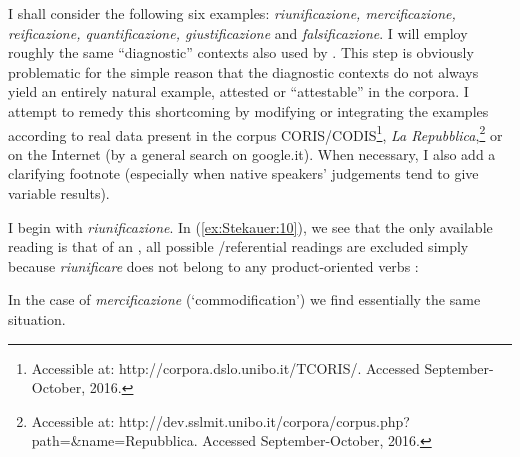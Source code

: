 \documentclass[output=paper]{langsci/langscibook}
\begin{document}
I shall consider the following six examples: \emph{riunificazione,
mercificazione, reificazione, quantificazione, giustificazione} and
\emph{falsificazione}. I will employ roughly the same ``diagnostic''
contexts also used by %
\citealt{Melloni2011}%
%
. This step is obviously problematic
for the simple reason that the diagnostic contexts do not always yield
an entirely natural example, attested or ``attestable'' in the corpora.
I attempt to remedy this shortcoming by modifying or integrating the
examples according to real data present in the corpus
CORIS/CODIS\footnote{Accessible at:
  http://corpora.dslo.unibo.it/TCORIS/. Accessed  September-October,
  2016.}, \emph{La Repubblica},\footnote{Accessible at:
  http://dev.sslmit.unibo.it/corpora/corpus.php?path=\&name=Repubblica.
  Accessed  Sep\-tember-October, 2016.} or on the Internet (by a general
search on google.it). When necessary, I also add a clarifying footnote
(especially when native speakers' judgements tend to give variable
results).

\newpage 
I begin with \emph{riunificazione}. In (\ref{ex:Stekauer:10}), we see that the only
available reading is that of an , all possible /referential
readings are excluded simply because \emph{riunificare} does not belong
to any product-oriented verbs %
\citep[in the sense of][184 ff.]{Melloni2011}%
%
:

\begin{exe}
\ex\label{ex:Stekauer:10}
\begin{xlist}
\end{xlist}
\end{exe}

In the case of \emph{mercificazione} (`commodification') we find
essentially the same situation.

\begin{exe}
\ex\label{ex:Stekauer:11}
\begin{xlist}

\end{xlist}
\end{exe}
\end{document}
